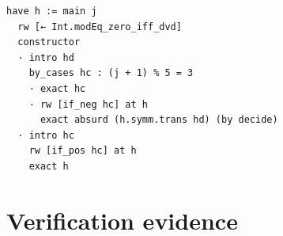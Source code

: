 \documentclass[11pt]{article}
\theoremstyle{definition}
\begin{document}
\begin{lstlisting}[caption={Excerpt: assembly of Theorem~\ref{thm:r1} from the
modulo-$2$ strengthening \texttt{main} proved at lines 160--251 of the same
file; verbatim lines 252--262 (contiguous block; the complete proofs of
Theorem~\ref{thm:r0} and Theorem~\ref{thm:r1} are lines 86--137 and 159--262,
in \texttt{proofs/}).},label={lst:p3}]
  have h := main j
  rw [← Int.modEq_zero_iff_dvd]
  constructor
  · intro hd
    by_cases hc : (j + 1) % 5 = 3
    · exact hc
    · rw [if_neg hc] at h
      exact absurd (h.symm.trans hd) (by decide)
  · intro hc
    rw [if_pos hc] at h
    exact h
\end{lstlisting}

\section{Verification evidence}
\end{document}
